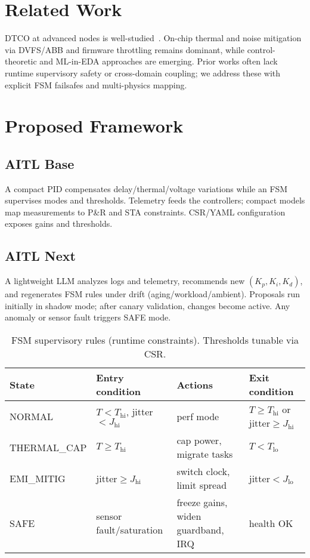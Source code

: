 \documentclass[conference]{IEEEtran}
\begin{document}
\section{Related Work}
DTCO at advanced nodes is well-studied~\cite{yakimets,irds}. On-chip thermal and noise mitigation via DVFS/ABB and firmware throttling remains dominant, while control-theoretic and ML-in-EDA approaches are emerging. Prior works often lack runtime supervisory safety or cross-domain coupling; we address these with explicit FSM failsafes and multi-physics mapping.

\section{Proposed Framework}
\subsection{AITL Base}
A compact PID compensates delay/thermal/voltage variations while an FSM supervises modes and thresholds. Telemetry feeds the controllers; compact models map measurements to P\&R and STA constraints. CSR/YAML configuration exposes gains and thresholds.

\subsection{AITL Next}
A lightweight LLM analyzes logs and telemetry, recommends new $(K_p,K_i,K_d)$, and regenerates FSM rules under drift (aging/workload/ambient). Proposals run initially in shadow mode; after canary validation, changes become active. Any anomaly or sensor fault triggers SAFE mode.

\begin{table}[t]
\centering
\caption{FSM supervisory rules (runtime constraints). Thresholds tunable via CSR.}
\label{tab:fsm}
\begin{tabular}{@{}llll@{}}
\toprule
State & Entry condition & Actions & Exit condition \\
\midrule
NORMAL & $T<T_\mathrm{hi}$, jitter$<J_\mathrm{hi}$ &
perf mode & $T\ge T_\mathrm{hi}$ or jitter$\ge J_\mathrm{hi}$ \\
THERMAL\_CAP & $T\ge T_\mathrm{hi}$ &
cap power, migrate tasks & $T<T_\mathrm{lo}$ \\
EMI\_MITIG & jitter$\ge J_\mathrm{hi}$ &
switch clock, limit spread & jitter$<J_\mathrm{lo}$ \\
SAFE & sensor fault/saturation &
freeze gains, widen guardband, IRQ & health OK \\
\bottomrule
\end{tabular}
\end{table}
\end{document}
